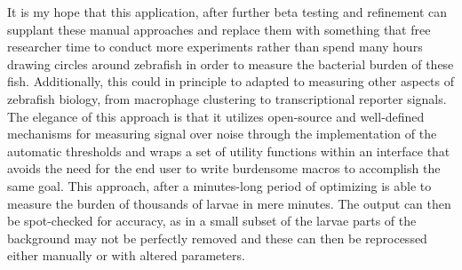 It is my hope that this application, after further beta testing and refinement can supplant these manual approaches and replace them with something that free researcher time to conduct more experiments rather than spend many hours drawing circles around zebrafish in order to measure the bacterial burden of these fish. Additionally, this could in principle to adapted to measuring other aspects of zebrafish biology, from macrophage clustering to transcriptional reporter signals. The elegance of this approach is that it utilizes open-source and well-defined mechanisms for measuring signal over noise through the implementation of the automatic thresholds and wraps a set of utility functions within an interface that avoids the need for the end user to write burdensome macros to accomplish the same goal. This approach, after a minutes-long period of optimizing is able to measure the burden of thousands of larvae in mere minutes. The output can then be spot-checked for accuracy, as in a small subset of the larvae parts of the background may not be perfectly removed and these can then be reprocessed either manually or with altered parameters. 


